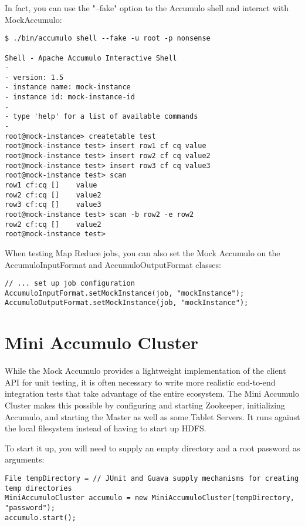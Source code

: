 In fact, you can use the "--fake" option to the Accumulo shell and interact with
MockAccumulo:

\small
\begin{verbatim}
$ ./bin/accumulo shell --fake -u root -p nonsense

Shell - Apache Accumulo Interactive Shell
-
- version: 1.5
- instance name: mock-instance
- instance id: mock-instance-id
-
- type 'help' for a list of available commands
-
root@mock-instance> createtable test
root@mock-instance test> insert row1 cf cq value
root@mock-instance test> insert row2 cf cq value2
root@mock-instance test> insert row3 cf cq value3
root@mock-instance test> scan
row1 cf:cq []    value
row2 cf:cq []    value2
row3 cf:cq []    value3
root@mock-instance test> scan -b row2 -e row2
row2 cf:cq []    value2
root@mock-instance test>
\end{verbatim}
\normalsize

When testing Map Reduce jobs, you can also set the Mock Accumulo on the AccumuloInputFormat
and AccumuloOutputFormat classes:

\small
\begin{verbatim}
// ... set up job configuration
AccumuloInputFormat.setMockInstance(job, "mockInstance");
AccumuloOutputFormat.setMockInstance(job, "mockInstance");
\end{verbatim}
\normalsize

\section{Mini Accumulo Cluster}

While the Mock Accumulo provides a lightweight implementation of the client API for unit
testing, it is often necessary to write more realistic end-to-end integration tests that
take advantage of the entire ecosystem. The Mini Accumulo Cluster makes this possible by
configuring and starting Zookeeper, initializing Accumulo, and starting the Master as well
as some Tablet Servers. It runs against the local filesystem instead of having to start
up HDFS.

To start it up, you will need to supply an empty directory and a root password as arguments:

\small
\begin{verbatim}
File tempDirectory = // JUnit and Guava supply mechanisms for creating temp directories
MiniAccumuloCluster accumulo = new MiniAccumuloCluster(tempDirectory, "password");
accumulo.start();
\end{verbatim}
\normalsize

